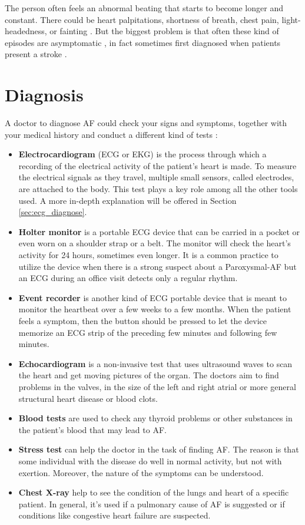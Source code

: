 The person often feels an abnormal beating that starts to become longer and constant. There could be heart palpitations, shortness of breath, chest pain,  light-headedness, or fainting \cite{chamberlain_gray_houghton_2010}. But the biggest problem is that often these kind of episodes are asymptomatic \cite{Munger2014}, in fact sometimes first diagnosed when patients present a stroke \cite{page2003asymptomatic}.

\section{Diagnosis}
\label{af_diagnosis}
A doctor to diagnose AF could check your signs and symptoms, together with your medical history and conduct a different kind of tests \cite{mayo_clinic_2019}:
\begin{itemize}
\item \textbf{Electrocardiogram} (ECG or EKG) is the process through which a recording of the electrical activity of the patient's heart is made. To measure the electrical signals as they travel, multiple small sensors, called electrodes, are attached to the body. This test plays a key role among all the other tools used. A more in-depth explanation will be offered in Section \ref{sec:ecg_diagnose}.
\item \textbf{Holter monitor} is a portable ECG device that can be carried in a pocket or even worn on a shoulder strap or a belt. The monitor will check the heart's activity for 24 hours, sometimes even longer. It is a common practice to utilize the device when there is a strong suspect about a Paroxysmal-AF but an ECG during an office visit detects only a regular rhythm.
\item \textbf{Event recorder} is another kind of ECG portable device that is meant to monitor the heartbeat over a few weeks to a few months. When the patient feels a symptom, then the button should be pressed to let the device memorize an ECG strip of the preceding few minutes and following few minutes.
\item \textbf{Echocardiogram} is a non-invasive test that uses ultrasound waves to scan the heart and get moving pictures of the organ. The doctors aim to find problems in the valves, in the size of the left and right atrial or more general structural heart disease or blood clots.
\item \textbf{Blood tests} are used to check any thyroid problems or other substances in the patient's blood that may lead to AF.
\item \textbf{Stress test} can help the doctor in the task of finding AF. The reason is that some individual with the disease do well in normal activity, but not with exertion. Moreover, the nature of the symptoms can be understood.
\item \textbf{Chest X-ray} help to see the condition of the lungs and heart of a specific patient. In general, it's used if a pulmonary cause of AF is suggested or if conditions like congestive heart failure are suspected.
\end{itemize}

